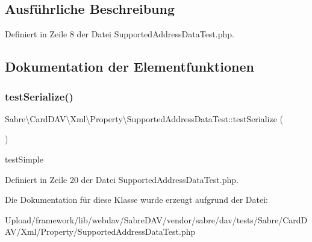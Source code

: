 \subsection{Ausführliche Beschreibung}


Definiert in Zeile 8 der Datei Supported\+Address\+Data\+Test.\+php.



\subsection{Dokumentation der Elementfunktionen}
\mbox{\label{class_sabre_1_1_card_d_a_v_1_1_xml_1_1_property_1_1_supported_address_data_test_a14b985ad6ed88533b69284913dca339c}} 
\subsubsection{\texorpdfstring{test\+Serialize()}{testSerialize()}}
{\footnotesize\ttfamily Sabre\textbackslash{}\+Card\+D\+A\+V\textbackslash{}\+Xml\textbackslash{}\+Property\textbackslash{}\+Supported\+Address\+Data\+Test\+::test\+Serialize (\begin{DoxyParamCaption}{ }\end{DoxyParamCaption})}

test\+Simple 

Definiert in Zeile 20 der Datei Supported\+Address\+Data\+Test.\+php.



Die Dokumentation für diese Klasse wurde erzeugt aufgrund der Datei\+:\begin{DoxyCompactItemize}
\item 
Upload/framework/lib/webdav/\+Sabre\+D\+A\+V/vendor/sabre/dav/tests/\+Sabre/\+Card\+D\+A\+V/\+Xml/\+Property/Supported\+Address\+Data\+Test.\+php\end{DoxyCompactItemize}
